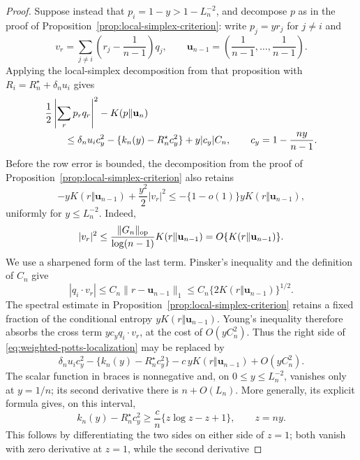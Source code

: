\begin{proof}
Suppose instead that \(p_i=1-y>1-L_n^{-2}\), and decompose \(p\) as in
the proof of Proposition~\ref{prop:local-simplex-criterion}: write
\(p_j=yr_j\) for \(j\ne i\) and
\[
 v_r=\sum_{j\ne i}\left(r_j-\frac1{n-1}\right)q_j,
 \qquad
 \mathbf u_{n-1}=\left(\frac1{n-1},\ldots,\frac1{n-1}\right).
\]
Applying the local-simplex decomposition from that proposition with
\(R_i=R_n^\star+\delta_nu_i\) gives
\begin{align}
\label{eq:weighted-potts-localization}
 &\frac12\left|\sum_rp_rq_r\right|^2-K(p\Vert \mathbf u_n)\notag\\
 &\qquad\le
 \delta_nu_i c_y^2
 -\{k_n(y)-R_n^\star c_y^2\}
 +y|c_y|C_n,
 \qquad c_y=1-\frac{ny}{n-1}.
\end{align}
Before the row error is bounded, the decomposition from the proof of
Proposition~\ref{prop:local-simplex-criterion} also retains
\begin{equation}
\label{eq:weighted-potts-conditional-entropy}
 -yK(r\Vert \mathbf u_{n-1})+\frac{y^2}{2}|v_r|^2
 \le-\{1-o(1)\}yK(r\Vert \mathbf u_{n-1}),
\end{equation}
uniformly for \(y\le L_n^{-2}\). Indeed,
\[
 |v_r|^2
 \le\frac{\|G_n\|_{\rm op}}{\log(n-1)}
       K(r\Vert \mathbf u_{n-1})
 =O\{K(r\Vert \mathbf u_{n-1})\}.
\]
We use a sharpened form of the last term. Pinsker's inequality and the
definition of \(C_n\) give
\[
 |q_i\cdot v_r|
 \le C_n\|r-\mathbf u_{n-1}\|_1
 \le C_n\{2K(r\Vert \mathbf u_{n-1})\}^{1/2}.
\]
The spectral estimate in
Proposition~\ref{prop:local-simplex-criterion} retains a fixed fraction of
the conditional entropy \(yK(r\Vert \mathbf u_{n-1})\). Young's inequality
therefore absorbs the cross term \(yc_yq_i\cdot v_r\), at the cost of
\(O(yC_n^2)\). Thus the right side of
\eqref{eq:weighted-potts-localization} may be replaced by
\begin{equation}
\label{eq:weighted-potts-localization-sharp}
 \delta_nu_i c_y^2
 -\{k_n(y)-R_n^\star c_y^2\}
 -c\,yK(r\Vert \mathbf u_{n-1})
 +O(yC_n^2).
\end{equation}
The scalar function in braces is nonnegative and, on
\(0\le y\le L_n^{-2}\), vanishes only at \(y=1/n\); its second
derivative there is \(n+O(L_n)\).  More generally, its explicit formula
gives, on this interval,
\begin{equation}
\label{eq:potts-scalar-local-stability}
 k_n(y)-R_n^\star c_y^2
 \ge
 \frac{c}{n}\{z\log z-z+1\},
 \qquad z=ny.
\end{equation}
This follows by differentiating the two sides on either side of \(z=1\);
both vanish with zero derivative at \(z=1\), while the second derivative

\end{proof}

